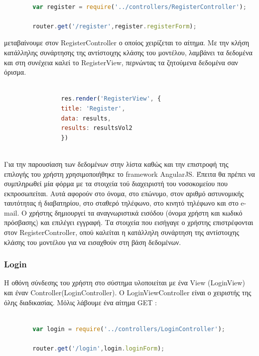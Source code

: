 		\begin{lstlisting}[language=Javascript]			
		
		var register = require('../controllers/RegisterController');
		
		router.get('/register',register.registerForm);  


		\end{lstlisting}
		

μεταβαίνουμε στον RegisterController ο οποίος χειρίζεται το αίτημα. Με την κλήση κατάλληλης συνάρτησης της αντίστοιχης κλάσης του μοντέλου, λαμβάνει τα δεδομένα και στη συνέχεια καλεί το RegisterView, περνώντας τα ζητούμενα δεδομένα σαν όρισμα.



		\begin{lstlisting}[language=Javascript]			
		
	            res.render('RegisterView', { 
                title: 'Register',
                data: results,
                results: resultsVol2
				})
				
		\end{lstlisting}


	Για την παρουσίαση των δεδομένων στην λίστα καθώς και την επιστροφή της επιλογής του χρήστη χρησιμοποιήθηκε το framework AngularJS. Έπειτα θα πρέπει να συμπληρωθεί μία φόρμα με τα στοιχεία τού διαχειριστή του νοσοκομείου που εκπροσωπείται. Αυτά αφορούν στο όνομα, στο επώνυμο, στον αριθμό αστυνομικής ταυτότητας ή διαβατηρίου, στο σταθερό τηλέφωνο, στο κινητό τηλέφωνο και στο e-mail. Ο χρήστης δημιουργεί τα αναγνωριστικά εισόδου (όνομα χρήστη και κωδικό πρόσβασης) και επιλέγει εγγραφή.  Τα στοιχεία που εισήγαγε ο χρήστης επιστρέφονται στον RegisterController, οπού καλείται η κατάλληλη συνάρτηση της αντίστοιχης κλάσης του μοντέλου για να εισαχθούν στη βάση δεδομένων.
	
	
		\subsubsection{Login}
		
	Η οθόνη σύνδεσης του χρήστη στο σύστημα υλοποιείται με ένα View (LoginView) και έναν Controller(LoginController).  O LoginViewController είναι ο χειριστής της όλης διαδικασίας. Μόλις λάβουμε ένα αίτημα GET :
		
		\begin{lstlisting}[language=Javascript]			
		
		var login = require('../controllers/LoginController');
		
		router.get('/login',login.loginForm);  


		\end{lstlisting}
		

